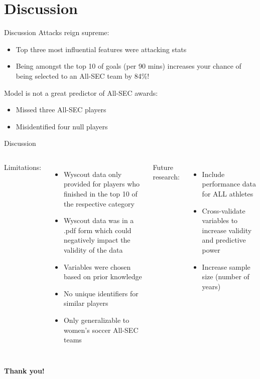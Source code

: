 \documentclass{beamer}					%
\begin{document}
\section{Discussion}

\begin{frame}{Discussion}
	Attacks reign supreme:
    \begin{itemize}
		\item Top three most influential features were attacking stats
        \item Being amongst the top 10 of goals (per 90 mins) increases your chance of being selected to an All-SEC team by 84\%!
	\end{itemize}

    	Model is not a great predictor of All-SEC awards:
    \begin{itemize}
		\item Missed three All-SEC players
        \item Misidentified four null players
	\end{itemize}
\end{frame}

\begin{frame}{Discussion}
	\begin{columns}
        Limitations:
    \begin{itemize}
		\item Wyscout data only provided for players who finished in the top 10 of the respective category
        \item Wyscout data was in a .pdf form which could negatively impact the validity of the data
        \item Variables were chosen based on prior knowledge
        \item No unique identifiers for similar players
        \item Only generalizable to women's soccer All-SEC teams
	\end{itemize}
        
        Future research:
    \begin{itemize}
		\item Include performance data for ALL athletes
        \item Cross-validate variables to increase validity and predictive power
        \item Increase sample size (number of years)
	\end{itemize}
	\end{columns}
\end{frame}
\begin{frame}[plain]

\centering

\vfill

{\Huge\bfseries Thank you!}

\vfill

\end{frame}
\end{document}
